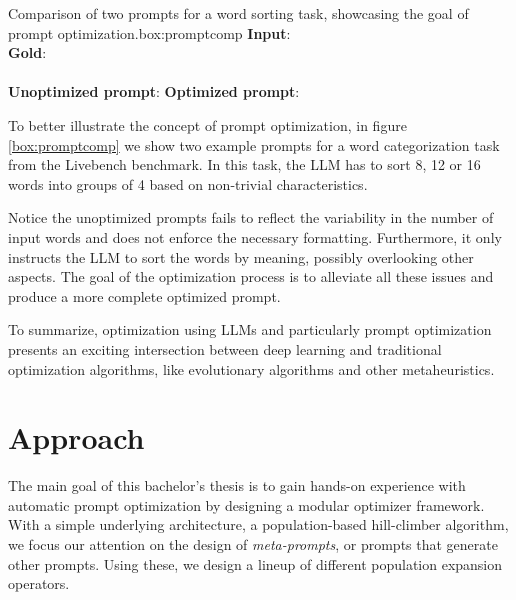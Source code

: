 \begin{figurebox}{Comparison of two prompts for a word sorting task, showcasing the goal of prompt optimization.}{box:promptcomp}
    \textbf{Input}:  \\
    \textbf{Gold}: \,\, \\\\
    \textbf{Unoptimized prompt}:
    \textbf{Optimized prompt}:
\end{figurebox}
\newpage
To better illustrate the concept of prompt optimization, in figure \ref{box:promptcomp} we show two example prompts for a word categorization task from the 
Livebench\cite{white2025livebenchchallengingcontaminationlimitedllm} benchmark. In this task, the LLM has to sort 8, 12 or 16 words into groups of 4 based on non-trivial characteristics. 

Notice the unoptimized prompts fails to reflect the variability in the number of input words and does not enforce the necessary formatting. 
Furthermore, it only instructs the LLM to sort the words by meaning, possibly overlooking other aspects. The goal of the optimization process is to 
alleviate all these issues and produce a more complete optimized prompt.

To summarize, optimization using LLMs\cite{meyerson2024languagemodelcrossovervariation}\cite{liu2024largelanguagemodelsevolutionary} and particularly prompt optimization
presents an exciting intersection between deep learning and traditional optimization algorithms, like evolutionary algorithms\cite{guo2024connectinglargelanguagemodels}\cite{cui2024phaseevounifiedincontextprompt}\cite{fernando2023promptbreederselfreferentialselfimprovementprompt} and other metaheuristics\cite{pan2024plumpromptlearningusing}.

\section{Approach}
The main goal of this bachelor's thesis is to gain hands-on experience with automatic prompt optimization by designing a modular optimizer framework.
With a simple underlying architecture, a population-based hill-climber algorithm, we focus our attention on the design of \textit{meta-prompts}, or prompts that 
generate other prompts. Using these, we design a lineup of different population expansion operators. 

